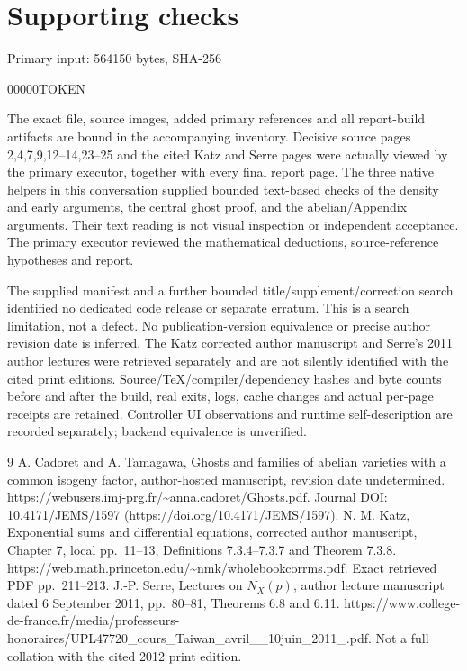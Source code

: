 \documentclass[10pt]{article}
\begin{document}
\section*{Supporting checks}
Primary input: 564150 bytes, SHA-256\par
00000TOKEN\par
The exact file, source images, added primary references and all report-build artifacts are bound in the accompanying inventory. Decisive source pages 2,4,7,9,12–14,23–25 and the cited Katz and Serre pages were actually viewed by the primary executor, together with every final report page. The three native helpers in this conversation supplied bounded text-based checks of the density and early arguments, the central ghost proof, and the abelian/Appendix arguments. Their text reading is not visual inspection or independent acceptance. The primary executor reviewed the mathematical deductions, source-reference hypotheses and report.\par
The supplied manifest and a further bounded title/supplement/correction search identified no dedicated code release or separate erratum. This is a search limitation, not a defect. No publication-version equivalence or precise author revision date is inferred. The Katz corrected author manuscript and Serre’s 2011 author lectures were retrieved separately and are not silently identified with the cited print editions. Source/TeX/compiler/dependency hashes and byte counts before and after the build, real exits, logs, cache changes and actual per-page receipts are retained. Controller UI observations and runtime self-description are recorded separately; backend equivalence is unverified.\par
9 A. Cadoret and A. Tamagawa, Ghosts and families of abelian varieties with a common isogeny factor, author-hosted manuscript, revision date undetermined. https://webusers.imj-prg.fr/\textasciitilde{}anna.cadoret/Ghosts.pdf. Journal DOI: 10.4171/JEMS/1597 (https://doi.org/10.4171/JEMS/1597). N. M. Katz, Exponential sums and differential equations, corrected author manuscript, Chapter 7, local pp. 11–13, Definitions 7.3.4–7.3.7 and Theorem 7.3.8. https://web.math.princeton.edu/\textasciitilde{}nmk/wholebookcorrms.pdf. Exact retrieved PDF pp. 211–213. J.-P. Serre, Lectures on \(N_X(p)\), author lecture manuscript dated 6 September 2011, pp. 80–81, Theorems 6.8 and 6.11. https://www.college-de-france.fr/media/professeurs-honoraires/UPL47720\_cours\_Taiwan\_avril\_\_10juin\_2011\_.pdf. Not a full collation with the cited 2012 print edition.\par
\end{document}
